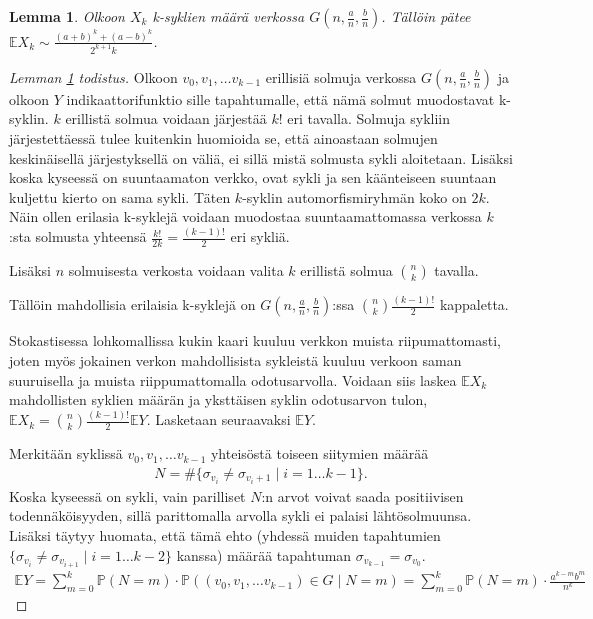 \documentclass[finnish,12pt,a4paper,pdftex,sci,utf8]{aaltothesis}
\newtheorem{lemma}{Lemma}
\begin{document}
\begin{lemma}
	\label{lemma:k-syklit_odotus}
	Olkoon $X_k$ k-syklien määrä verkossa $G(n,\frac{a}{n},\frac{b}{n})$. Tällöin pätee\\ $\mathbb{E}X_k \sim \frac{(a+b)^k + (a-b)^k}{2^{k+1}k}$. 
\end{lemma}


\begin{proof}[Lemman \ref{lemma:k-syklit_odotus} todistus]
	Olkoon $v_0, v_1, \ldots v_{k-1}$ erillisiä solmuja verkossa $G(n,\frac{a}{n},\frac{b}{n})$ ja olkoon $Y$ indikaattorifunktio sille tapahtumalle, että nämä solmut muodostavat k-syklin. $k$ erillistä solmua voidaan järjestää $k!$ eri tavalla. Solmuja sykliin järjestettäessä tulee kuitenkin huomioida se, että ainoastaan solmujen keskinäisellä järjestyksellä on väliä, ei sillä mistä solmusta sykli aloitetaan. Lisäksi koska kyseessä on suuntaamaton verkko, ovat sykli ja sen käänteiseen suuntaan kuljettu kierto on sama sykli. Täten $k$-syklin automorfismiryhmän koko on $2k$. Näin ollen erilasia k-syklejä voidaan muodostaa suuntaamattomassa verkossa $k$:sta solmusta yhteensä $\frac{k!}{2k} = \frac{(k-1)!}{2}$ eri sykliä.

	Lisäksi $n$ solmuisesta verkosta voidaan valita $k$ erillistä solmua $\binom{n}{k}$ tavalla.

	Tällöin mahdollisia erilaisia k-syklejä on $G(n,\frac{a}{n},\frac{b}{n})$:ssa $\binom{n}{k} \frac{(k-1)!}{2}$ kappaletta.
	
	Stokastisessa lohkomallissa kukin kaari kuuluu verkkon muista riipumattomasti, joten myös jokainen verkon mahdollisista sykleistä kuuluu verkoon saman suuruisella ja muista riippumattomalla odotusarvolla. Voidaan siis laskea $\mathbb{E}X_k$ mahdollisten syklien määrän ja yksttäisen syklin odotusarvon tulon, $\mathbb{E}X_k = \binom{n}{k} \frac{(k-1)!}{2} \mathbb{E}Y$. Lasketaan seuraavaksi $\mathbb{E}Y$.

	Merkitään syklissä $v_0, v_1, \ldots v_{k-1}$ yhteisöstä toiseen siitymien määrää 
	\begin{align*}
		N = \#\{\sigma_{v_i} \neq \sigma_{v_i+1} \mid i = 1 \ldots k-1 \}. 
	\end{align*}
	Koska kyseessä on sykli, vain parilliset $N$:n arvot voivat saada positiivisen todennäköisyyden, sillä parittomalla arvolla sykli ei palaisi lähtösolmuunsa. Lisäksi täytyy huomata, että tämä ehto (yhdessä muiden tapahtumien $\{\sigma_{v_i} \neq \sigma_{v_{i+1}} \mid i = 1 \ldots k-2\}$ kanssa) määrää tapahtuman $\sigma_{v_{k-1}} = \sigma_{v_0}$.
	\begin{align*}
		\mathbb{E}Y = \sum^{k}_{m=0}\mathbb{P}(N=m) \cdot \mathbb{P}((v_0, v_1, \ldots v_{k-1}) \in G \mid N=m)
		= \sum^{k}_{m=0}\mathbb{P}(N=m) \cdot  \frac{a^{k-m}b^{m}}{n^{k}} 
	\end{align*}
		



\end{proof}
\end{document}

